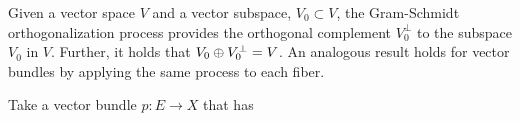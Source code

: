 \documentclass[../../sean_thesis.tex]{subfiles}
\begin{document}
	
	\begin{lemma}
	\end{lemma}	
	
	Given a vector space $V$ and a vector subspace, $V_0 \subset V$, the Gram-Schmidt orthogonalization process provides the orthogonal complement $V_0^{\perp}$ to the subspace $V_0$ in $V$. Further, it holds that $V_0 \oplus V_0^{\perp} = V$. An analogous result holds for vector bundles by applying the same process to each fiber.
	
	\begin{lemma}
		Take a vector bundle $p: E \to X$ that has 
	\end{lemma}
	
\end{document}
